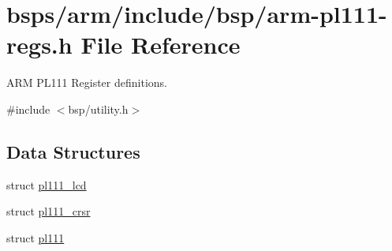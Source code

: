 \hypertarget{arm-pl111-regs_8h}{}\section{bsps/arm/include/bsp/arm-\/pl111-\/regs.h File Reference}
\label{arm-pl111-regs_8h}


A\+RM P\+L111 Register definitions.  


{\ttfamily \#include $<$bsp/utility.\+h$>$}\newline
\subsection*{Data Structures}
\begin{DoxyCompactItemize}
\item 
struct \mbox{\hyperlink{structpl111__lcd}{pl111\+\_\+lcd}}
\item 
struct \mbox{\hyperlink{structpl111__crsr}{pl111\+\_\+crsr}}
\item 
struct \mbox{\hyperlink{structpl111}{pl111}}
\end{DoxyCompactItemize}
